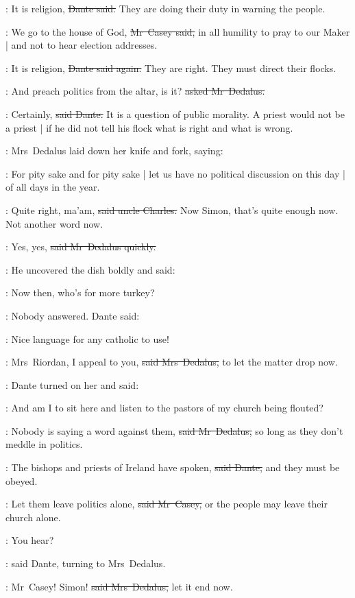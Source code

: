 \dante:
It is religion,
\sout{Dante said.}
They are doing their duty in warning the people.

\casey:
We go to the house of God,
\sout{Mr~Casey said,}
in all humility to pray to our Maker |
and not to hear election addresses.

\dante:
It is religion,
\sout{Dante said again.}
They are right.
They must direct their flocks.

\simon:
And preach politics from the altar,
is it?
\sout{asked Mr~Dedalus.}

\dante:
Certainly,
\sout{said Dante.}
It is a question of public morality.
A priest would not be a priest |
if he did not tell his flock
what is right and what is wrong.

:
Mrs~Dedalus laid down her knife and fork,
saying:

\marydedalus:
For pity sake and for pity sake |
let us have no political discussion
on this day |
of all days in the year.

\charles:
Quite right, ma’am,
\sout{said uncle Charles.}
Now Simon, that’s quite enough now.
Not another word now.

\simon:
Yes, yes,
\sout{said Mr~Dedalus quickly.}

:
He uncovered the dish boldly
and said:

\simon:
Now then,
who’s for more turkey?

:
Nobody answered.
Dante said:

\dante:
Nice language for any catholic to use!

\marydedalus:
Mrs~Riordan,
I appeal to you,
\sout{said Mrs~Dedalus,}
to let the matter drop now.

:
Dante turned on her and said:

\dante:
And am I to sit here
and listen to the pastors of my church
being flouted?

\simon:
Nobody is saying a word against them,
\sout{said Mr~Dedalus,}
so long as they don’t meddle in politics.

\dante:
The bishops and priests of Ireland have spoken,
\sout{said Dante,}
and they must be obeyed.

\casey:
Let them leave politics alone,
\sout{said Mr~Casey,}
or the people may leave their church alone.

\dante:
You hear?

:
said Dante,
turning to Mrs~Dedalus.

\marydedalus:
Mr~Casey!
Simon!
\sout{said Mrs~Dedalus,}
let it end now.

